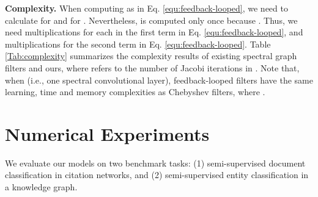 \documentclass{article}
\begin{document}
\begin{table}[h!]
\centering\vspace{-0cm}
 \caption{Learning, time and space complexities of spectral graph filters. \label{Tab:complexity}}\vspace{-0.3cm}
\end{table}
\noindent\textbf{Complexity. } When computing  as in Eq. \ref{equ:feedback-looped}, we need to calculate  for  and  for . Nevertheless,  is computed only once because . Thus, we need  multiplications for each  in the first term in Eq. \ref{equ:feedback-looped}, and  multiplications for the second term in Eq. \ref{equ:feedback-looped}. Table \ref{Tab:complexity} summarizes the complexity results of existing spectral graph filters and ours, where  refers to the number of Jacobi iterations in \cite{levie2017cayleynets}. Note that, when  (i.e., one spectral convolutional layer), feedback-looped filters have the same learning, time and memory complexities as Chebyshev filters, where .
 
\section{Numerical Experiments}
\label{sec:experiments}
We evaluate our models on two benchmark tasks: (1) semi-supervised document classification in citation networks, and (2) semi-supervised entity classification in a knowledge graph.   
\end{document}

